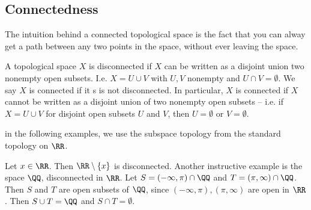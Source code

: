 \subsection{Connectedness}
The intuition behind a connected topological space is the fact that you can
alway get a path between any two points in the space, without ever leaving the
space.
\begin{definition}
  A topological space $X$ is disconnected if $X$ can be written as a disjoint
  union two nonempty open subsets. I.e. $X=U\cup V$ with $U,V$ nonempty and
  $U\cap V=\emptyset$. We say $X$ is connected if it s is not disconnected. In
  particular, $X$ is connected if $X$ cannot be written as a disjoint union of
  two nonempty open subsets -- i.e. if $X=U\cup V$ for disjoint open subsets $U$
  and $V$, then $U=\emptyset$ or $V=\emptyset$.
  \label{def:connectedTopoSpace}
\end{definition}
in the following examples, we use the subspace topology from the standard
topology on $\RR$.
\begin{example}
  Let $x\in\RR$. Then $\RR\setminus\{x\}$ is disconnected. Another instructive
  example is the space $\QQ$, disconnected in $\RR$. Let $S=(-\infty, \pi)\cap
  \QQ$ and $T=(\pi, \infty)\cap\QQ$. Then $S$ and $T$ are open subsets of $\QQ$,
  since $(-\infty,\pi),(\pi,\infty)$ are open in $\RR$.  Then $S\cup T=\QQ$ and
  $S\cap T=\emptyset$.
\end{example}
